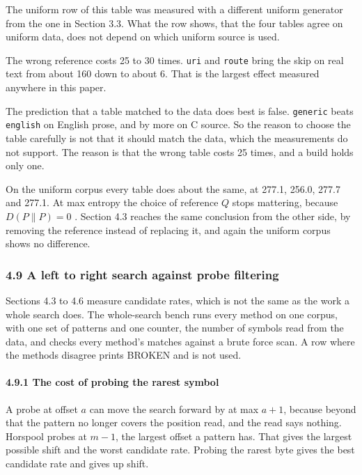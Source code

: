The uniform row of this table was measured with a different uniform generator from the one in Section 3.3. What the row shows, that the four tables agree on uniform data, does not depend on which uniform source is used.

The wrong reference costs 25 to 30 times. \texttt{uri} and \texttt{route} bring the skip on real text from about 160 down to about 6. That is the largest effect measured anywhere in this paper.

The prediction that a table matched to the data does best is false. \texttt{generic} beats \texttt{english} on English prose, and by more on C source. So the reason to choose the table carefully is not that it should match the data, which the measurements do not support. The reason is that the wrong table costs 25 times, and a build holds only one.

On the uniform corpus every table does about the same, at 277.1, 256.0, 277.7 and 277.1. At max entropy the choice of reference \(Q\) stops mattering, because \(D(P\|P) = 0\) \cite{src:Kullback}. Section 4.3 reaches the same conclusion from the other side, by removing the reference instead of replacing it, and again the uniform corpus shows no difference.

\subsubsection{4.9 A left to right search against probe filtering}

Sections 4.3 to 4.6 measure candidate rates, which is not the same as the work a whole search does. The whole-search bench runs every method on one corpus, with one set of patterns and one counter, the number of symbols read from the data, and checks every method's matches against a brute force scan. A row where the methods disagree prints BROKEN and is not used.

\paragraph{4.9.1 The cost of probing the rarest symbol}

A probe at offset \(a\) can move the search forward by at max \(a+1\), because beyond that the pattern no longer covers the position read, and the read says nothing. Horspool \cite{src:Horspool} probes at \(m-1\), the largest offset a pattern has. That gives the largest possible shift and the worst candidate rate. Probing the rarest byte gives the best candidate rate and gives up shift.

